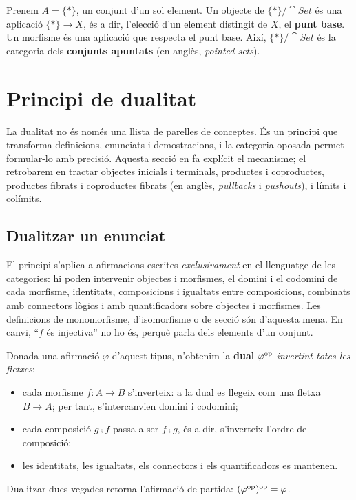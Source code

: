 \begin{exemple}
Prenem $A=\{\ast\}$, un conjunt d'un sol element. Un objecte de $\{\ast\}/\cat{Set}$ és una aplicació $\{\ast\}\to X$, és a dir, l'elecció d'un element distingit de $X$, el \textbf{punt base}. Un morfisme és una aplicació que respecta el punt base. Així, $\{\ast\}/\cat{Set}$ és la categoria dels \textbf{conjunts apuntats} (en anglès, \emph{pointed sets}).
\end{exemple}

\section{Principi de dualitat}\label{sec:dualitat}

La dualitat no és només una llista de parelles de conceptes. És un principi que transforma definicions, enunciats i demostracions, i la categoria oposada permet formular-lo amb precisió. Aquesta secció en fa explícit el mecanisme; el retrobarem en tractar objectes inicials i terminals, productes i coproductes, productes fibrats i coproductes fibrats (en anglès, \emph{pullbacks} i \emph{pushouts}), i límits i colímits.

\subsection{Dualitzar un enunciat}

El principi s'aplica a afirmacions escrites \emph{exclusivament} en el llenguatge de les categories: hi poden intervenir objectes i morfismes, el domini i el codomini de cada morfisme, identitats, composicions i igualtats entre composicions, combinats amb connectors lògics i amb quantificadors sobre objectes i morfismes. Les definicions de monomorfisme, d'isomorfisme o de secció són d'aquesta mena. En canvi, \enquote{$f$ és injectiva} no ho és, perquè parla dels elements d'un conjunt.

Donada una afirmació $\varphi$ d'aquest tipus, n'obtenim la \textbf{dual} $\varphi^{\mathrm{op}}$ \emph{invertint totes les fletxes}:
\begin{itemize}
  \item cada morfisme $f\colon A\to B$ s'inverteix: a la dual es llegeix com una fletxa $B\to A$; per tant, s'intercanvien domini i codomini;
  \item cada composició $g\comp f$ passa a ser $f\comp g$, és a dir, s'inverteix l'ordre de composició;
  \item les identitats, les igualtats, els connectors i els quantificadors es mantenen.
\end{itemize}
Dualitzar dues vegades retorna l'afirmació de partida: $(\varphi^{\mathrm{op}})^{\mathrm{op}}=\varphi$.

